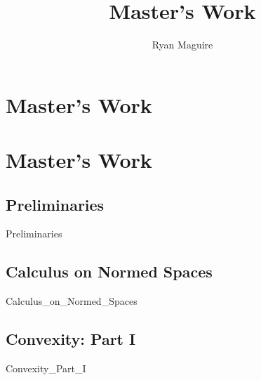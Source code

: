 \documentclass[crop=false,class=book,oneside]{standalone}
\begin{document}
    \newif\ifworkmasterswork
    \ifx\ifresearch\undefined
        \title{Master's Work}
        \author{Ryan Maguire}
        \date{\vspace{-5ex}}
        \maketitle
        \tableofcontents
        \clearpage
        \chapter*{Master's Work}
        \setcounter{chapter}{1}
        \graphicspath{{../../images/}}
    \else
        \chapter{Master's Work}
    \fi
    \section{Preliminaries}
        {Preliminaries}
    \section{Calculus on Normed Spaces}
        {Calculus_on_Normed_Spaces}
    \section{Convexity: Part I}
        {Convexity_Part_I}
\end{document}

